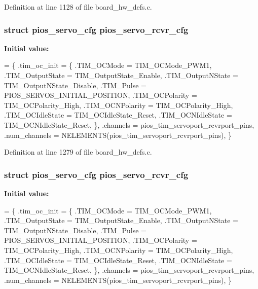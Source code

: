 Definition at line 1128 of file board\-\_\-hw\-\_\-defs.\-c.

\hypertarget{group___tau_labs_core_gaa111328ef9a12c806ed1c24b93d4f663}{
\subsubsection[{pios\-\_\-servo\-\_\-rcvr\-\_\-cfg}]{\setlength{\rightskip}{0pt plus 5cm}struct {\bf pios\-\_\-servo\-\_\-cfg} pios\-\_\-servo\-\_\-rcvr\-\_\-cfg}}\label{group___tau_labs_core_gaa111328ef9a12c806ed1c24b93d4f663}
{\bfseries Initial value\-:}
\begin{DoxyCode}
= \{
        .tim\_oc\_init = \{
                .TIM\_OCMode = TIM\_OCMode\_PWM1,
                .TIM\_OutputState = TIM\_OutputState\_Enable,
                .TIM\_OutputNState = TIM\_OutputNState\_Disable,
                .TIM\_Pulse = PIOS\_SERVOS\_INITIAL\_POSITION,
                .TIM\_OCPolarity = TIM\_OCPolarity\_High,
                .TIM\_OCNPolarity = TIM\_OCPolarity\_High,
                .TIM\_OCIdleState = TIM\_OCIdleState\_Reset,
                .TIM\_OCNIdleState = TIM\_OCNIdleState\_Reset,
        \},
        .channels = pios\_tim\_servoport\_rcvrport\_pins,
        .num\_channels = NELEMENTS(pios\_tim\_servoport\_rcvrport\_pins),
\}
\end{DoxyCode}


Definition at line 1279 of file board\-\_\-hw\-\_\-defs.\-c.

\hypertarget{group___tau_labs_core_gaa111328ef9a12c806ed1c24b93d4f663}{
\subsubsection[{pios\-\_\-servo\-\_\-rcvr\-\_\-cfg}]{\setlength{\rightskip}{0pt plus 5cm}struct {\bf pios\-\_\-servo\-\_\-cfg} pios\-\_\-servo\-\_\-rcvr\-\_\-cfg}}\label{group___tau_labs_core_gaa111328ef9a12c806ed1c24b93d4f663}
{\bfseries Initial value\-:}
\begin{DoxyCode}
= \{
        .tim\_oc\_init = \{
                .TIM\_OCMode = TIM\_OCMode\_PWM1,
                .TIM\_OutputState = TIM\_OutputState\_Enable,
                .TIM\_OutputNState = TIM\_OutputNState\_Disable,
                .TIM\_Pulse = PIOS\_SERVOS\_INITIAL\_POSITION,
                .TIM\_OCPolarity = TIM\_OCPolarity\_High,
                .TIM\_OCNPolarity = TIM\_OCPolarity\_High,
                .TIM\_OCIdleState = TIM\_OCIdleState\_Reset,
                .TIM\_OCNIdleState = TIM\_OCNIdleState\_Reset,
        \},
        .channels = pios\_tim\_servoport\_rcvrport\_pins,
        .num\_channels = NELEMENTS(pios\_tim\_servoport\_rcvrport\_pins),
\}
\end{DoxyCode}


